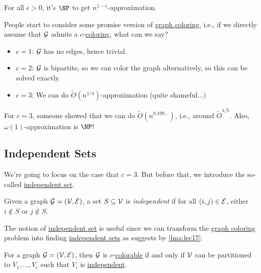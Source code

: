 \begin{theorem}
	For all \(\epsilon > 0\), it's \(\NP\) to get \(n^{1 - \epsilon }\)-approximation.
\end{theorem}

People start to consider some promise version of \hyperref[prb:graph-coloring]{graph coloring}, i.e., if we directly assume that \(\mathcal{\MakeUppercase{g}} \) admits a \(c\)-\hyperref[def:coloring]{coloring}, what can we say?
\begin{itemize}
	\item \(c = 1\): \(\mathcal{\MakeUppercase{g}} \) has no edges, hence trivial.
	\item \(c = 2\): \(\mathcal{\MakeUppercase{g}} \) is bipartite, so we can color the graph alternatively, so this can be solved exactly.
	\item \(c = 3\): We can do \(\widetilde{O} (n^{1 / 4})\)-approximation (quite shameful...)
\end{itemize}
\begin{remark}[SOTA for \(c=3\)]
	For \(c = 3\), someone showed that we can do \(\widetilde{O} (n^{0.199\ldots  })\), i.e., around \(\widetilde{O} ^{1 / 5}\). Also, \(\omega (1)\)-approximation is \(\NP\)!
\end{remark}

\subsection{Independent Sets}
We're going to focus on the case that \(c=3\). But before that, we introduce the so-called \hyperref[def:independent-set]{independent set}.
\begin{definition}\label{def:independent-set}
	Given a graph \(\mathcal{\MakeUppercase{g}} =(\mathcal{\MakeUppercase{v}} , \mathcal{\MakeUppercase{e}} )\), a set \(S \subseteq \mathcal{\MakeUppercase{v}} \) is \emph{independent} if for all \((i, j)\in \mathcal{\MakeUppercase{e}} \), either \(i \notin S\) or \(j \notin S\).
\end{definition}

The notion of \hyperref[def:independent-set]{independent set} is useful since we can transform the \hyperref[prb:graph-coloring]{graph coloring} problem into finding \hyperref[def:independent-set]{independent sets} as suggests by \autoref{lma:lec17}.

\begin{lemma}\label{lma:lec17}
	For a graph \(\mathcal{\MakeUppercase{g}} = (\mathcal{\MakeUppercase{v}} , \mathcal{\MakeUppercase{e}} )\), then \(\mathcal{\MakeUppercase{g}} \) is \(c\)-\hyperref[def:coloring]{colorable} if and only if \(\mathcal{\MakeUppercase{v}} \) can be partitioned to \(V_1, \ldots, V_c\) such that \(V_i\) is \hyperref[def:independent-set]{independent}.
\end{lemma}

